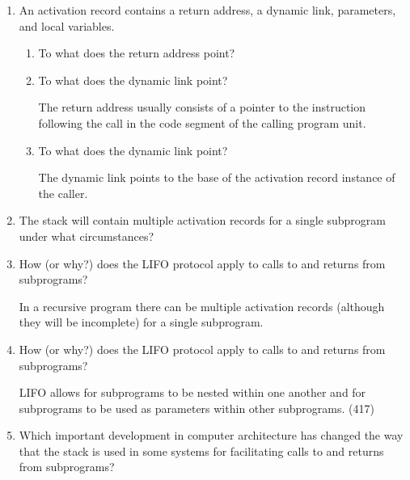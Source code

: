\begin{enumerate}
  \item An activation record contains a return
    address, a dynamic link, parameters, and
    local variables.
  \begin{enumerate}
    \item To what does the return address point?

    \item To what does the dynamic link point?

      \begin{answer}
      The return address usually consists of a pointer to the
      instruction following the call in the code segment of the
      calling program unit.
      \end{answer}

    \item To what does the dynamic link point?
      \begin{answer}
        The dynamic link points to the base of the activation record
        instance of the caller.
        \end{answer}

    \end{enumerate}

  \item The stack will contain multiple activation
    records for a single subprogram under what
    circumstances?

  \item How (or why?) does the LIFO protocol apply to
    calls to and returns from subprograms?

  \begin{answer}
    In a recursive program there can be multiple activation records
    (although they will be incomplete) for a single subprogram.
    \end{answer}

  \item How (or why?) does the LIFO protocol apply to
    calls to and returns from subprograms?
  
  \begin{answer}
    LIFO allows for subprograms to be nested within one another and
    for subprograms to be used as parameters within other
    subprograms. (417)
    \end{answer}

  \item Which important development in computer architecture
    has changed the way that the stack is used in some
    systems for facilitating calls to and returns from
    subprograms?


\end{enumerate}
